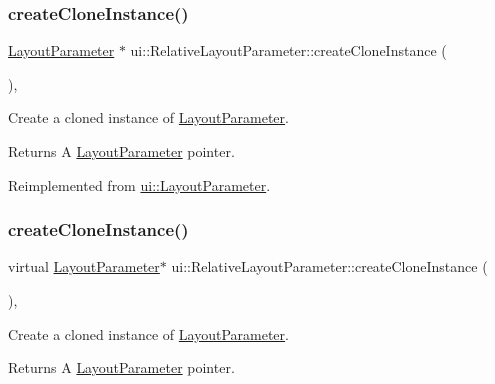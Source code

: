 \subsubsection{\texorpdfstring{create\+Clone\+Instance()}{createCloneInstance()}\hspace{0.1cm}{\footnotesize\ttfamily [1/2]}}
{\footnotesize\ttfamily \hyperlink{classui_1_1LayoutParameter}{Layout\+Parameter} $\ast$ ui\+::\+Relative\+Layout\+Parameter\+::create\+Clone\+Instance (\begin{DoxyParamCaption}{ }\end{DoxyParamCaption})\hspace{0.3cm}{\ttfamily [override]}, {\ttfamily [virtual]}}

Create a cloned instance of \hyperlink{classui_1_1LayoutParameter}{Layout\+Parameter}. \begin{DoxyReturn}{Returns}
A \hyperlink{classui_1_1LayoutParameter}{Layout\+Parameter} pointer. 
\end{DoxyReturn}


Reimplemented from \hyperlink{classui_1_1LayoutParameter_a6ca908e0dd4f85238894b28d5d816974}{ui\+::\+Layout\+Parameter}.

\mbox{\label{classui_1_1RelativeLayoutParameter_ad3da385d6428bced2722a6308ce685f4}} 
\subsubsection{\texorpdfstring{create\+Clone\+Instance()}{createCloneInstance()}\hspace{0.1cm}{\footnotesize\ttfamily [2/2]}}
{\footnotesize\ttfamily virtual \hyperlink{classui_1_1LayoutParameter}{Layout\+Parameter}$\ast$ ui\+::\+Relative\+Layout\+Parameter\+::create\+Clone\+Instance (\begin{DoxyParamCaption}{ }\end{DoxyParamCaption})\hspace{0.3cm}{\ttfamily [override]}, {\ttfamily [virtual]}}

Create a cloned instance of \hyperlink{classui_1_1LayoutParameter}{Layout\+Parameter}. \begin{DoxyReturn}{Returns}
A \hyperlink{classui_1_1LayoutParameter}{Layout\+Parameter} pointer. 
\end{DoxyReturn}


